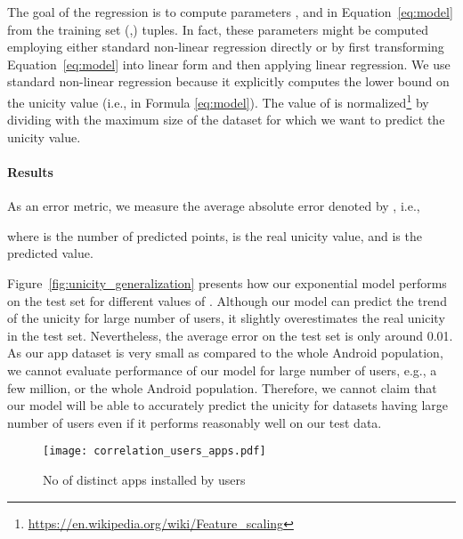 \documentclass{acm_proc_article-sp}
\theoremstyle{plain}
\theoremstyle{plain}
\theoremstyle{plain}
\theoremstyle{plain}
\theoremstyle{plain}
\theoremstyle{plain}
\begin{document}
The goal of the regression is to compute parameters , and  in Equation~\ref{eq:model} from the training set  (,) tuples.
In fact, these parameters might be computed employing either standard non-linear regression directly or by first transforming Equation~\ref{eq:model} into linear form and then applying linear regression.
We use standard non-linear regression because it explicitly computes the lower bound on the unicity value (i.e.,  in Formula \ref{eq:model}).
The value of  is normalized\footnote{\url{https://en.wikipedia.org/wiki/Feature_scaling}} by dividing  with the maximum size of the dataset for which we want to predict the unicity value.










\paragraph{Results}

As an error metric, we measure the average absolute error denoted by , i.e., 

where  is the number of predicted points,   is the real unicity value, and  is the predicted value.

Figure~\ref{fig:unicity_generalization} presents how our exponential model performs on the test set for different values of .
Although our model can predict the trend of the unicity for large number of users, it slightly overestimates the real unicity in the test set.
Nevertheless, the average error  on the test set is only around 0.01. 
As our app dataset is very small as compared to the whole Android population, we cannot evaluate performance of our model for large number of users, e.g., a few million, or the whole Android population.
Therefore, we cannot claim that our model will be able to accurately predict the unicity for datasets having large number of users even if it performs reasonably well on our test data.
















\begin{figure}[!t]
        \centering
	\texttt{[image: correlation\_users\_apps.pdf]}
	\caption{No of distinct apps installed by users}
	\label{fig:correlation_users_apps}
\end{figure}
\end{document}
